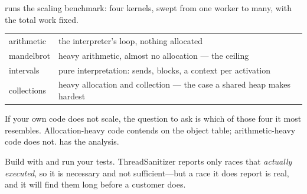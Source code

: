  runs the scaling benchmark: four kernels, swept from one
worker to many, with the total work fixed.

\begin{center}
\small
\begin{tabular}{@{}lp{}@{}}
\toprule
arithmetic & the interpreter's loop, nothing allocated\\
mandelbrot & heavy arithmetic, almost no allocation --- the ceiling\\
intervals & pure interpretation: sends, blocks, a context per activation\\
collections & heavy allocation and collection --- the case a shared heap makes
  hardest\\
\bottomrule
\end{tabular}
\end{center}

If your own code does not scale, the question to ask is which of those four it
most resembles. Allocation-heavy code contends on the object table;
arithmetic-heavy code does not.  has the analysis.

\begin{stnote}
Build with  and run your tests. ThreadSanitizer reports only races
that \emph{actually executed}, so it is necessary and not sufficient---but a
race it does report is real, and it will find them long before a customer
does.
\end{stnote}
